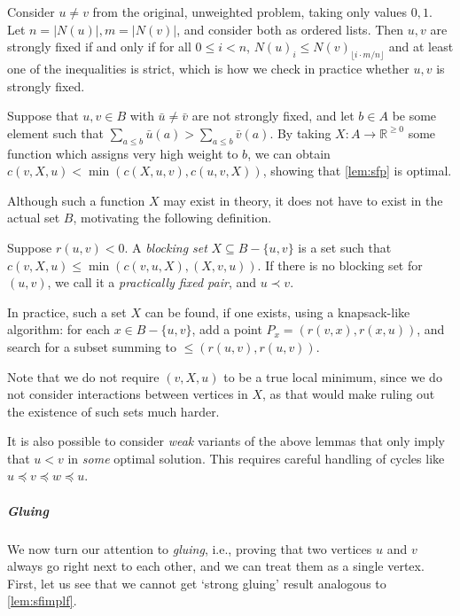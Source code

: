 \documentclass[a4paper,UKenglish,cleveref, autoref, thm-restate]{lipics-v2021}
\renewcommand{\b}{\prec}
\newcommand{\be}{\preceq}
\begin{document}
\begin{remark}
    Consider $u \neq v$ from the original, unweighted problem, taking only values $0, 1$. Let 
    $n = |N(u)|, m = |N(v)|$, and consider both as ordered lists. Then $u, v$ are strongly
    fixed if and only if for all $0 \leq i < n$, $N(u)_i \leq N(v)_{\lfloor i\cdot m/n
    \rfloor}$ and at least one of the inequalities is strict, which is how we check in practice whether $u, v$ is strongly fixed.
\end{remark}

\begin{remark}\label{rem:strongest}
    Suppose that $u, v \in B$ with $\bar u \neq \bar v$ are not strongly fixed, and let $b \in
    A$ be some element such
    that $\sum_{a \leq b} \bar u(a) > \sum_{a \leq b} \bar v(a)$. By taking $X: A \to \mathbb
    R^{\geq 0}$ some function which assigns very high
    weight to $b$, we can obtain $c(v, X, u) < \min(c(X, u, v), c(u, v, X))$, showing that
    \cref{lem:sfp} is optimal.
\end{remark}
Although such a function $X$ may exist in theory, it does
not have to exist in the actual set $B$, motivating the following definition.

\begin{lemma}\label{pfp}
  Suppose $r(u,v)< 0$.
    A \emph{blocking set} $X\subseteq B-\{u,v\}$ is a set such that $c(v,X,u) \leq \min(c(v, u,
    X), (X, v, u))$.  If there is no blocking set for $(u, v)$, we call it a
    \emph{practically fixed pair}, and $u\b v$.
\end{lemma}

In practice, such a set $X$ can be found, if one exists, using a knapsack-like algorithm: for
each $x\in B-\{u,v\}$, add a point $P_x = (r(v, x), r(x, u))$, and search for a subset summing
to ${\leq{}(r(u, v), r(u, v))}$.

Note that we do not require $(v, X, u)$ to be a true local minimum, since we do
not consider interactions between vertices in $X$, as that would make ruling out the
existence of such sets much harder.

\begin{remark}
  It is also possible to consider \emph{weak} variants of the above lemmas that
  only imply that $u < v$ in \emph{some} optimal solution. This requires careful
  handling of cycles like $u\be v\be w\be u$.
\end{remark}

\subparagraph{Gluing}
We now turn our attention to \emph{gluing}, i.e., proving that two vertices $u$
and $v$ always go right next to each other, and we can treat them as a single vertex. First,
let us see that we cannot get `strong gluing' result analogous to \cref{lem:sfimplf}.
\end{document}
